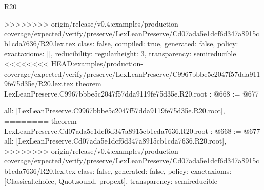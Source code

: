 \begin{lexlean}{R20}
\begin{coremodule}
{{{{{{{{{{{>>>>>>>> origin/release/v0.4:examples/production-coverage/expected/verify/preserve/LexLeanPreserve/Cd07ada5e1dcf6d347a8915cb1cda7636/R20.lex.tex
  class: false,
  compiled: true,
  generated: false,
  policy: exact{axioms: []},
  reducibility: regular{height: 3},
  transparency: semireducible
}
<<<<<<<< HEAD:examples/production-coverage/expected/verify/preserve/LexLeanPreserve/C9967bbbe5c2047f57dda9119fe75d35e/R20.lex.tex
theorem LexLeanPreserve.C9967bbbe5c2047f57dda9119fe75d35e.R20.root : @668 := @677 {
  all: [LexLeanPreserve.C9967bbbe5c2047f57dda9119fe75d35e.R20.root],
========
theorem LexLeanPreserve.Cd07ada5e1dcf6d347a8915cb1cda7636.R20.root : @668 := @677 {
  all: [LexLeanPreserve.Cd07ada5e1dcf6d347a8915cb1cda7636.R20.root],
>>>>>>>> origin/release/v0.4:examples/production-coverage/expected/verify/preserve/LexLeanPreserve/Cd07ada5e1dcf6d347a8915cb1cda7636/R20.lex.tex
  class: false,
  generated: false,
  policy: exact{axioms: [Classical.choice, Quot.sound, propext]},
  transparency: semireducible
}

}}}}}}}}}}}
\end{coremodule}
\end{lexlean}
